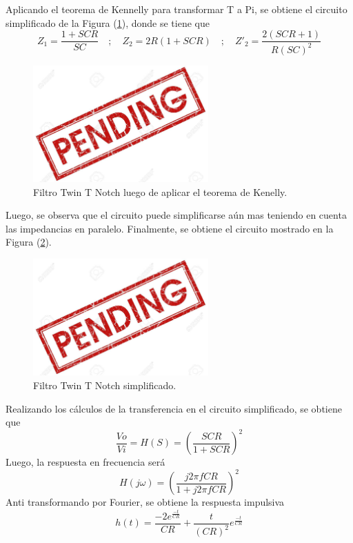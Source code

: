 \documentclass[a4paper]{article}
\begin{document}
Aplicando el teorema de Kennelly para transformar T a Pi, se obtiene el circuito simplificado de la Figura (\ref{fig:filtrosimplificado}), donde se tiene que
\[Z_1=\frac{1+SCR}{SC}\hspace{1em};\hspace{1em} Z_2=2R(1+SCR) \hspace{1em};\hspace{1em} Z'_2=\frac{2(SCR+1)}{R(SC)^2}\]

\begin{figure}[H]
	\centering
	\includegraphics[width=0.6\textwidth]{pend.jpg}
\caption{Filtro Twin T Notch luego de aplicar el teorema de Kenelly.}
	\label{fig:filtrosimplificado}
\end{figure}

Luego, se observa que el circuito puede simplificarse aún mas teniendo en cuenta las impedancias en paralelo. Finalmente, se obtiene el circuito mostrado en la Figura (\ref{fig:filtrofinal}).

\begin{figure}[H]
	\centering
	\includegraphics[width=0.6\textwidth]{pend.jpg}
\caption{Filtro Twin T Notch simplificado.}
	\label{fig:filtrofinal}
\end{figure}

Realizando los cálculos de la transferencia en el circuito simplificado, se obtiene que
\[ \frac{Vo}{Vi}=H(S)=\left( \frac{SCR}{1+SCR} \right)^2 \] 
Luego, la respuesta en frecuencia será
\[H(j\omega)=\left( \frac{j 2\pi f CR}{1+ j2\pi f CR} \right)^2 \]
Anti transformando por Fourier, se obtiene la respuesta impulsiva
\[h(t)=\frac{-2e^{\frac{-t}{CR}}}{CR}+\frac{t}{(CR)^2}e^{\frac{-t}{CR}}\]
\end{document}
